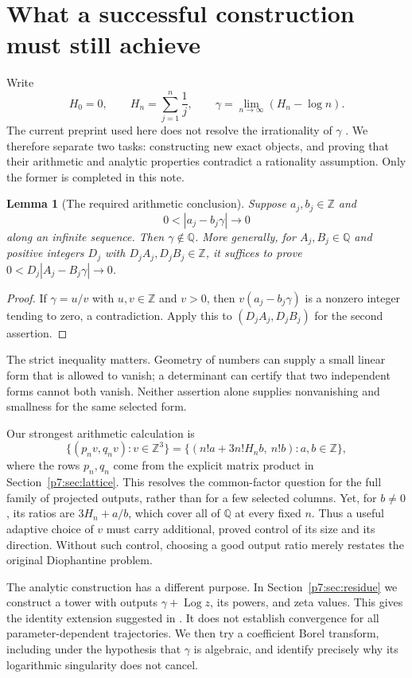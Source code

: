 \documentclass[11pt,a4paper]{article}
\newtheorem{lemma}[theorem]{Lemma}
\theoremstyle{definition}
\theoremstyle{remark}
\newcommand{\Q}{\mathbb Q}
\newcommand{\Z}{\mathbb Z}
\DeclareMathOperator{\Log}{Log}
\numberwithin{equation}{section}
\begin{document}
\section{What a successful construction must still achieve}
\label{p7:sec:introduction}

Write
\[
 H_0=0,\qquad H_n=\sum_{j=1}^n\frac1j,\qquad
 \gamma=\lim_{n\to\infty}(H_n-\log n).
\]
The current preprint used here does not resolve the irrationality of
$\gamma$ \cite{p7:Kalisch2026}. We therefore separate two tasks: constructing
new exact objects, and proving that their arithmetic and analytic
properties contradict a rationality assumption. Only the former is
completed in this note.

\begin{lemma}[The required arithmetic conclusion]
\label{p7:lem:smallform}
Suppose $a_j,b_j\in\Z$ and
\[
 0<|a_j-b_j\gamma|\longrightarrow0
\]
along an infinite sequence. Then $\gamma\notin\Q$.
More generally, for $A_j,B_j\in\Q$ and positive integers $D_j$ with
$D_jA_j,D_jB_j\in\Z$, it suffices to prove
$0<D_j|A_j-B_j\gamma|\to0$.
\end{lemma}
\begin{proof}
If $\gamma=u/v$ with $u,v\in\Z$ and $v>0$, then
$v(a_j-b_j\gamma)$ is a nonzero integer tending to zero, a contradiction.
Apply this to $(D_jA_j,D_jB_j)$ for the second assertion.
\end{proof}

The strict inequality matters. Geometry of numbers can supply a small
linear form that is allowed to vanish; a determinant can certify that two
independent forms cannot both vanish. Neither assertion alone supplies
nonvanishing and smallness for the same selected form.

Our strongest arithmetic calculation is
\begin{equation}
\label{p7:eq:intro-lattice}
 \{(p_nv,q_nv):v\in\Z^3\}
 =
 \{(n!a+3n!H_nb,\ n!b):a,b\in\Z\},
\end{equation}
where the rows $p_n,q_n$ come from the explicit matrix product in
Section~\ref{p7:sec:lattice}. This resolves the common-factor question for
the full family of projected outputs, rather than for a few selected
columns. Yet, for $b\ne0$, its ratios are $3H_n+a/b$, which cover all of
$\Q$ at every fixed $n$. Thus a useful adaptive choice of $v$ must carry
additional, proved control of its size and its direction. Without such
control, choosing a good output ratio merely restates the original
Diophantine problem.

The analytic construction has a different purpose. In
Section~\ref{p7:sec:residue} we construct a tower with outputs
$\gamma+\Log z$, its powers, and zeta values. This gives the
identity extension suggested in \cite[Section 9.2(1)]{p7:Kalisch2026}.
It does not establish convergence for all parameter-dependent
trajectories. We then try a coefficient Borel transform, including under
the hypothesis that $\gamma$ is algebraic, and identify precisely why
its logarithmic singularity does not cancel.
\end{document}
